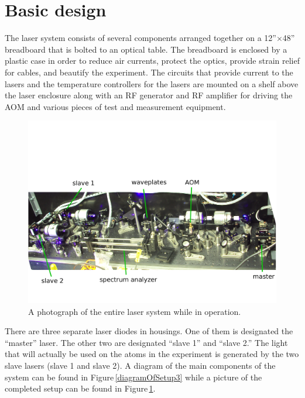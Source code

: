 \section{Basic design}
The laser system consists of several components arranged together on a 12''$\times$48'' breadboard that is bolted to an optical table. The breadboard is enclosed by a plastic case in order to reduce air currents, protect the optics, provide strain relief for cables, and beautify the experiment. The circuits that provide current to the lasers and the temperature controllers for the lasers are mounted on a shelf above the laser enclosure along with an RF generator and RF amplifier for driving the AOM and various pieces of test and measurement equipment.  
\begin{figure}
    \centerline{\includegraphics[width=1\textwidth]{entire_setup}}
    \caption[Photo of entire laser system]{\label{fullexperimentphoto}
A photograph of the entire laser system while in operation.
    }
\end{figure}

There are three separate laser diodes in housings. One of them is designated the ``master'' laser. The other two are designated ``slave 1'' and ``slave 2.'' The light that will actually be used on the atoms in the experiment is generated by the two slave lasers (slave 1 and slave 2).
 A diagram of the main components of the system can be found in Figure\,\ref{diagramOfSetup3} while a picture of the completed setup can be found in Figure\,\ref{fullexperimentphoto}. 

